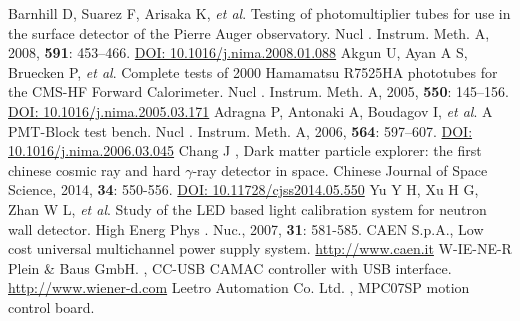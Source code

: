 \documentclass{nst}
\providecommand{\DIFadd}[1]{{\protect\color{yellow} #1}} %
\providecommand{\DIFaddbegin}{} %
\providecommand{\DIFaddend}{} %
\providecommand{\DIFdelbegin}{} %
\providecommand{\DIFdelend}{} %
\begin{document}
\begin{thebibliography}{99}
	 Barnhill D, Suarez F, Arisaka K, \emph{et al}. Testing of photomultiplier tubes for use in the surface detector of the {Pierre} {Auger} observatory. Nucl\DIFdelbegin \DIFdelend \DIFaddbegin \DIFadd{. Instrum. Meth. }\DIFaddend A, 2008, {\bf 591}: 453--466.
	\href{http://dx.doi.org/10.1016/j.nima.2008.01.088}{DOI: 10.1016/j.nima.2008.01.088}
	 Akgun U, Ayan A S, Bruecken P, \emph{et al}. Complete tests of 2000 {Hamamatsu} {R}7525HA phototubes for the {CMS}-{HF} {Forward} {Calorimeter}. Nucl\DIFdelbegin \DIFdelend \DIFaddbegin \DIFadd{. Instrum. Meth. }\DIFaddend A, 2005, {\bf 550}: 145--156.
	\href{http://dx.doi.org/10.1016/j.nima.2005.03.171}{DOI: 10.1016/j.nima.2005.03.171}
	 Adragna P, Antonaki A, Boudagov I, \emph{et al}. A {PMT}-{Block} test bench. Nucl\DIFdelbegin \DIFdelend \DIFaddbegin \DIFadd{. Instrum. Meth. }\DIFaddend A, 2006, {\bf 564}: 597--607.
	\href{http://dx.doi.org/10.1016/j.nima.2006.03.045}{DOI: 10.1016/j.nima.2006.03.045}
	 Chang J\DIFdelbegin \DIFdelend \DIFaddbegin \DIFadd{, Dark matter particle explorer: the first chinese cosmic ray and hard }\DIFaddend $\gamma$-ray \DIFdelbegin \DIFdelend \DIFaddbegin \DIFadd{detector in space}\DIFaddend . Chinese Journal of Space Science, 2014, {\bf 34}: 550-556.
	\href{http://dx.doi.org/10.11728/cjss2014.05.550}{DOI: 10.11728/cjss2014.05.550}
	 Yu Y H, Xu H G, Zhan W L, \emph{et al}. Study of the LED based light calibration system for neutron wall detector. High Energ Phys\DIFdelbegin \DIFdelend \DIFaddbegin \DIFadd{. Nuc.}\DIFaddend , 2007, {\bf 31}: 581-585.
	 {CAEN S.p.A.}, Low \DIFdelbegin %
\DIFdelend \DIFaddbegin \DIFadd{cost universal multichannel power supply system. }\href{http://www.caen.it/csite/CaenProd.jsp?idmod=491&parent=20}{http://www.caen.it}
	\DIFaddend {} {W-IE-NE-R Plein \& Baus GmbH.}\DIFaddbegin \DIFadd{, }\DIFaddend {CC-USB CAMAC \DIFdelbegin \DIFdelend \DIFaddbegin \DIFadd{controller }\DIFaddend with USB interface}. \DIFdelbegin %
\DIFdelend \DIFaddbegin \href{http://www.wiener-d.com/sc/modules/camac--modules/cc-usb.html}{http://www.wiener-d.com}
	\DIFaddend {} {Leetro Automation Co. Ltd.}\DIFaddbegin \DIFadd{, }\DIFaddend {MPC07SP \DIFdelbegin \DIFdelend \DIFaddbegin \DIFadd{motion control board}\DIFaddend }. \DIFdelbegin %

\end{thebibliography}
\end{document}
